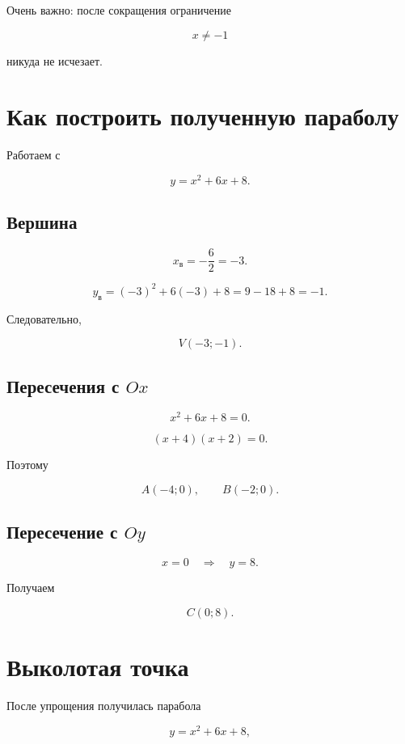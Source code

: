 \documentclass[a4paper,12pt]{article}
\begin{document}
Очень важно: после сокращения ограничение

\[
x\ne-1
\]

никуда не исчезает.

\section{Как построить полученную параболу}

Работаем с

\[
y=x^2+6x+8.
\]

\subsection{Вершина}

\[
x_{\mathrm{в}}
=
-\frac{6}{2}
=
-3.
\]

\[
y_{\mathrm{в}}
=
(-3)^2+6(-3)+8
=
9-18+8
=
-1.
\]

Следовательно,

\[
\boxed{V(-3;-1)}.
\]

\subsection{Пересечения с \(Ox\)}

\[
x^2+6x+8=0.
\]

\[
(x+4)(x+2)=0.
\]

Поэтому

\[
\boxed{A(-4;0)},
\qquad
\boxed{B(-2;0)}.
\]

\subsection{Пересечение с \(Oy\)}

\[
x=0
\quad\Longrightarrow\quad
y=8.
\]

Получаем

\[
\boxed{C(0;8)}.
\]

\section{Выколотая точка}

После упрощения получилась парабола

\[
y=x^2+6x+8,
\]
\end{document}
